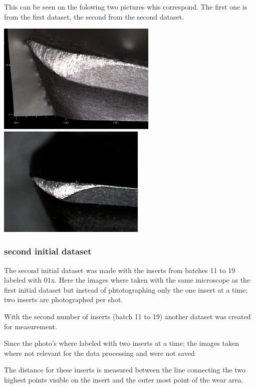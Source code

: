 		This can be seen on the folowing two pictures whis correspond. The first one is from the first dataset, the second from the second dataset.

			\includegraphics[height=2.083333in, keepaspectratio=true]{./fig/Vision/Dataset/handmade_datasets/Second_handmade_dataset/t50b-img.PNG}\includegraphics[height=2.083333in, keepaspectratio=true]{./fig/Vision/Dataset/handmade_datasets/Second_handmade_dataset/b_005_p_010_s.jpg}
	
		\subsubsection{second initial dataset}

			The second initial dataset was made with the inserts from batches 11 to 19 labeled with 01x. Here the images where taken with the same microscope as the first initial dataset but instead of phtotographing only the one insert at a time; two inserts are photographed per shot.
			
With the second number of inserts (batch 11 to 19) another dataset was created for measurement.

Since the photo's where labeled with two inserts at a time; the images taken where not relevant for the data processing and were not saved

The distance for these inserts is measured between the line connecting the two highest points visible on the insert and the outer most point of the wear area.

